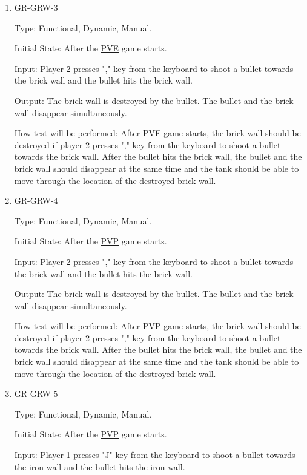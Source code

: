 \documentclass[12pt, titlepage]{article}
\begin{document}
\begin{enumerate}
\item{GR-GRW-3\\}

Type: Functional, Dynamic, Manual.
					
Initial State: After the \underline{PVE} game starts. 
					
Input: Player 2 presses "," key from the keyboard to shoot a bullet towards the brick wall and the bullet hits the brick wall.
					
Output: The brick wall is destroyed by the bullet. The bullet and the brick wall disappear simultaneously.
					
How test will be performed: After \underline{PVE} game starts, the brick wall should be destroyed if player 2 presses "," key from the keyboard to shoot a bullet towards the brick wall. After the bullet hits the brick wall, the bullet and the brick wall should disappear at the same time and the tank should be able to move through the location of the destroyed brick wall.

\item{GR-GRW-4\\}

Type: Functional, Dynamic, Manual.
					
Initial State: After the \underline{PVP} game starts. 
					
Input: Player 2 presses "," key from the keyboard to shoot a bullet towards the brick wall and the bullet hits the brick wall.
					
Output: The brick wall is destroyed by the bullet. The bullet and the brick wall disappear simultaneously.
					
How test will be performed: After \underline{PVP} game starts, the brick wall should be destroyed if player 2 presses "," key from the keyboard to shoot a bullet towards the brick wall. After the bullet hits the brick wall, the bullet and the brick wall should disappear at the same time and the tank should be able to move through the location of the destroyed brick wall.




\item{GR-GRW-5\\}

Type: Functional, Dynamic, Manual.
					
Initial State: After the \underline{PVP} game starts. 
					
Input: Player 1 presses "J" key from the keyboard to shoot a bullet towards the iron wall and the bullet hits the iron wall.
					

\end{enumerate}
\end{document}

